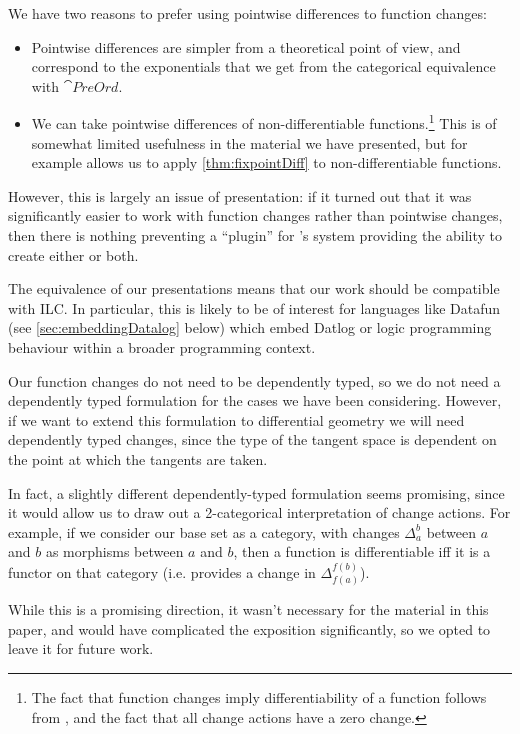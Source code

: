 We have two reasons to prefer using pointwise differences to function changes:
\begin{itemize}
  \item Pointwise differences are simpler from a theoretical point of view, and
    correspond to the exponentials that we get from the categorical equivalence with $\cat{PreOrd}$. 
  \item We can take pointwise differences of non-differentiable
    functions.\footnote{The fact that function changes imply differentiability
      of a function follows from \textcite[][Theorem 2.10]{cai2014changes}, and
      the fact that all change actions have a zero change.} This
    is of somewhat limited usefulness in the material we have presented, but for
    example allows us to apply \cref{thm:fixpointDiff} to non-differentiable functions.
\end{itemize}

However, this is largely an issue of presentation: if it turned out that it was
significantly easier to work with function changes rather than pointwise
changes, then there is nothing preventing a ``plugin'' for \citeauthor{cai2014changes}'s system providing the
ability to create either or both.

The equivalence of our presentations means that our work should be compatible
with ILC. In particular, this is likely to be of interest for languages like
Datafun (see \cref{sec:embeddingDatalog} below) which embed Datlog or logic programming behaviour within a broader
programming context.

Our function changes do not need to be dependently typed, so we do not need a
dependently typed formulation for the cases we have been considering. However,
if we want to extend this formulation to differential geometry we will need
dependently typed changes, since the type of the tangent space is
dependent on the point at which the tangents are taken.

In fact, a slightly different dependently-typed formulation seems promising, since it would allow us
to draw out a 2-categorical interpretation of change actions. For example, if
we consider our base set as a category, with changes $\Delta_a^b$ between $a$
and $b$ as morphisms between $a$ and $b$, then a function is
differentiable iff it is a functor on that category (i.e. provides a change in
$\Delta_{f(a)}^{f(b)}$). 

While this is a promising direction, it wasn't necessary for the material in
this paper, and would have complicated the exposition significantly, so we opted
to leave it for future work.

